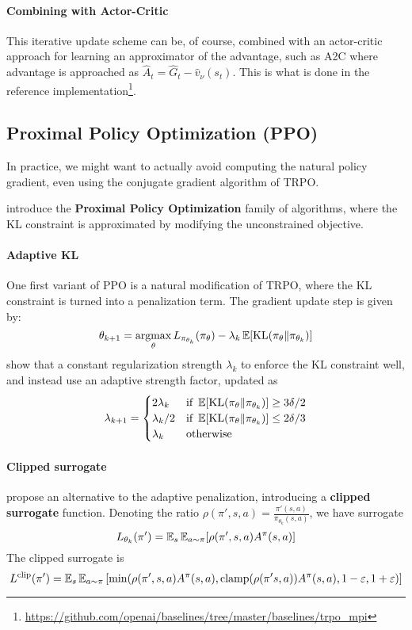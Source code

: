 \documentclass[../course-notes.tex]{subfiles}
\begin{document}
\paragraph{Combining with Actor-Critic} This iterative update scheme can be, of course, combined with an actor-critic approach for learning an approximator of the advantage, such as A2C where advantage is approached as $\widehat{A}_t = \widehat{G}_t - \widehat{v}_\nu(s_t)$. This is what is done in the reference implementation\footnote{\url{https://github.com/openai/baselines/tree/master/baselines/trpo_mpi}}.


\subsection{Proximal Policy Optimization (PPO) \parencite{schulman2017proximal}}

In practice, we might want to actually avoid computing the natural policy gradient, even using the conjugate gradient algorithm of TRPO. 

\textcite{schulman2017proximal} introduce the \textbf{Proximal Policy Optimization} family of algorithms, where the KL constraint is approximated by modifying the unconstrained objective.

\paragraph{Adaptive KL} One first variant of PPO is a natural modification of TRPO, where the KL constraint is turned into a penalization term. The gradient update step is given by:
\begin{equation}\label{eq:PPOKLupdate}
	\theta_{k+1} =\operatorname*{\mathrm{argmax}}_\theta L_{\pi_{\theta_k}}(\pi_\theta) - \lambda_k \operatorname{\mathbb{E}}[\mathrm{KL}(\pi_\theta\|\pi_{\theta_k})]
\end{equation}
\citeauthor{schulman2017proximal} show that a constant regularization strength $\lambda_k$ to enforce the KL constraint well, and instead use an adaptive strength factor, updated as
\[
	\lambda_{k+1} = \begin{cases}
	2\lambda_k &\mbox{if } \operatorname{\mathbb{E}}[\operatorname{\mathrm{KL}}(\pi_\theta\|\pi_{\theta_k})] \geq 3\delta/2  \\
	\lambda_k/2 &\mbox{if }\operatorname{\mathbb{E}}[\operatorname{\mathrm{KL}}(\pi_\theta\|\pi_{\theta_k})] \leq 2\delta/3  \\
	\lambda_k &\mbox{otherwise}
	\end{cases}
\]

\paragraph{Clipped surrogate} \textcite{schulman2017proximal} propose an alternative to the adaptive penalization, introducing a \textbf{clipped surrogate} function. Denoting the ratio $\rho(\pi',s,a) = \frac{\pi'(s,a)}{\pi_{\theta_k}(s,a)}$, we have surrogate
\[
	L_{\theta_k}(\pi') = \operatorname{\mathbb{E}}_s\operatorname{\mathbb{E}}_{a\sim\pi} [\rho(\pi',s,a)A^\pi(s,a)]
\]
The clipped surrogate is
\begin{equation}
	L^\mathrm{clip}(\pi') = \operatorname{\mathbb{E}}_s\operatorname{\mathbb{E}}_{a\sim\pi}
	\left[\min(\rho(\pi',s,a)A^\pi(s,a), \mathrm{clamp}(\rho(\pi's,a))A^\pi(s,a), 1-\varepsilon, 1+\varepsilon)
	\right]
\end{equation}
\end{document}
